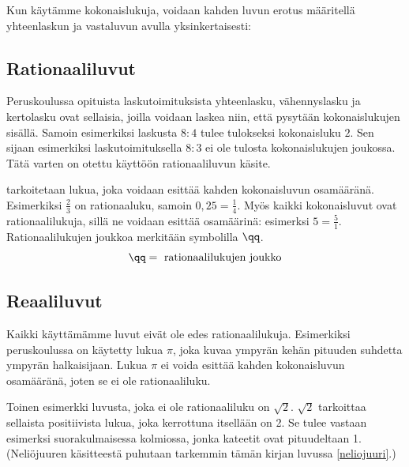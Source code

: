 %

Kun käytämme kokonaislukuja, voidaan kahden luvun erotus määritellä
yhteenlaskun ja vastaluvun avulla yksinkertaisesti:

\laatikko{
\[m-n = m+(-n)\]
}

\subsection*{Rationaaliluvut}

Peruskoulussa opituista laskutoimituksista yhteenlasku, vähennyslasku ja kertolasku ovat sellaisia, joilla voidaan laskea niin, että pysytään kokonaislukujen sisällä. Samoin esimerkiksi laskusta $8:4$ tulee tulokseksi kokonaisluku $2$. Sen sijaan esimerkiksi laskutoimituksella $8:3$ ei ole tulosta kokonaislukujen joukossa. Tätä varten on otettu käyttöön rationaaliluvun käsite.

 tarkoitetaan lukua, joka voidaan esittää kahden kokonaisluvun osamääränä. Esimerkiksi $\frac{2}{3}$ on rationaaluku, samoin $0,25=\frac{1}{4}$. Myös kaikki kokonaisluvut ovat rationaalilukuja, sillä ne voidaan esittää osamäärinä: esimerksi $5=\frac{5}{1}$. Rationaalilukujen joukkoa merkitään symbolilla $\qq$. \[\qq= \text{ rationaalilukujen joukko} \]    


\subsection*{Reaaliluvut}

Kaikki käyttämämme luvut eivät ole edes rationaalilukuja. Esimerkiksi peruskoulussa on käytetty lukua $\pi$, joka kuvaa ympyrän kehän pituuden suhdetta ympyrän halkaisijaan. Lukua $\pi$ ei voida esittää kahden kokonaisluvun osamääränä, joten se ei ole rationaaliluku.

Toinen esimerkki luvusta, joka ei ole rationaaliluku on $\sqrt{2}$. $\sqrt{2}$ tarkoittaa sellaista positiivista lukua, joka kerrottuna itsellään on 2. Se tulee vastaan esimerksi suorakulmaisessa kolmiossa, jonka kateetit ovat pituudeltaan 1. (Neliöjuuren käsitteestä puhutaan tarkemmin tämän kirjan luvussa \ref{neliojuuri}.)

